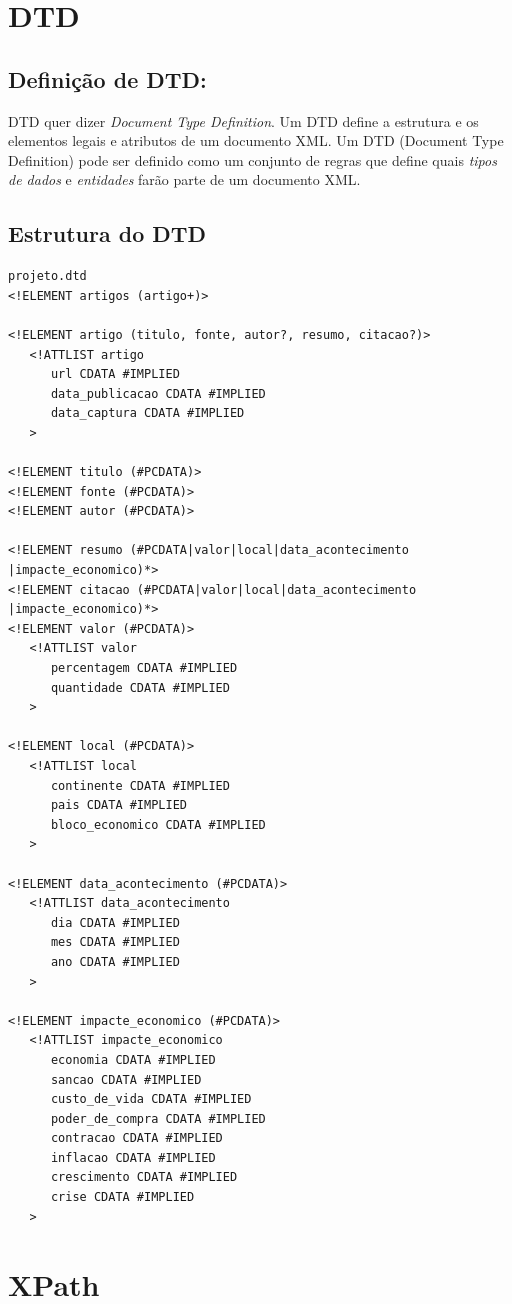 \documentclass[12pt]{report}
\begin{document}
\chapter{DTD}
\section{Definição de DTD:}
DTD quer dizer \textit{Document Type Definition}. Um DTD define a estrutura e os elementos legais e atributos de um documento XML. Um DTD (Document Type Definition) pode ser definido como um conjunto de regras que define quais \textit{tipos de dados} e \textit{entidades} farão parte de um documento XML.
\section{Estrutura do DTD}
\begin{verbatim}
projeto.dtd
<!ELEMENT artigos (artigo+)>

<!ELEMENT artigo (titulo, fonte, autor?, resumo, citacao?)>
   <!ATTLIST artigo
      url CDATA #IMPLIED
      data_publicacao CDATA #IMPLIED
      data_captura CDATA #IMPLIED
   >

<!ELEMENT titulo (#PCDATA)>
<!ELEMENT fonte (#PCDATA)>
<!ELEMENT autor (#PCDATA)>

<!ELEMENT resumo (#PCDATA|valor|local|data_acontecimento
|impacte_economico)*>
<!ELEMENT citacao (#PCDATA|valor|local|data_acontecimento
|impacte_economico)*>
<!ELEMENT valor (#PCDATA)>
   <!ATTLIST valor
      percentagem CDATA #IMPLIED
      quantidade CDATA #IMPLIED
   >

<!ELEMENT local (#PCDATA)>
   <!ATTLIST local
      continente CDATA #IMPLIED
      pais CDATA #IMPLIED
      bloco_economico CDATA #IMPLIED
   >

<!ELEMENT data_acontecimento (#PCDATA)>
   <!ATTLIST data_acontecimento
      dia CDATA #IMPLIED
      mes CDATA #IMPLIED
      ano CDATA #IMPLIED
   >

<!ELEMENT impacte_economico (#PCDATA)>
   <!ATTLIST impacte_economico
      economia CDATA #IMPLIED
      sancao CDATA #IMPLIED
      custo_de_vida CDATA #IMPLIED
      poder_de_compra CDATA #IMPLIED
      contracao CDATA #IMPLIED
      inflacao CDATA #IMPLIED
      crescimento CDATA #IMPLIED
      crise CDATA #IMPLIED
   >
\end{verbatim}

\chapter{XPath}
\end{document}
